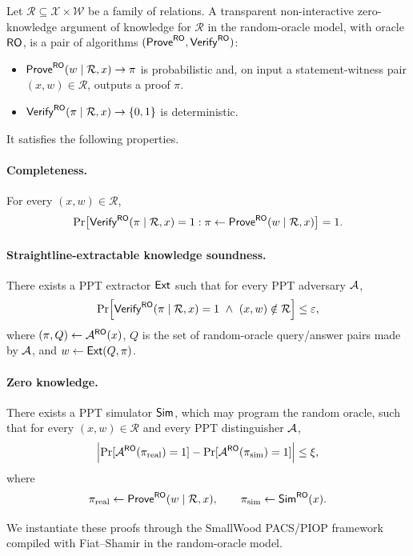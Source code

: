 \begin{definition}\label{def:nizk-ark}
Let $\mathcal R\subseteq \mathcal X\times \mathcal W$ be a family of relations.  A transparent non-interactive
zero-knowledge argument of knowledge for $\mathcal R$ in the random-oracle model, with oracle $\mathsf{RO}$, is a
pair of algorithms $(\mathsf{Prove}^{\mathsf{RO}},\mathsf{Verify}^{\mathsf{RO}})$:
\begin{itemize}[leftmargin=1.25em]
  \item $\mathsf{Prove}^{\mathsf{RO}}(w\mid \mathcal R,x)\to \pi$ is probabilistic and, on input a statement-witness pair
  $(x,w)\in\mathcal R$, outputs a proof $\pi$.
  \item $\mathsf{Verify}^{\mathsf{RO}}(\pi\mid \mathcal R,x)\to\{0,1\}$ is deterministic.
\end{itemize}
It satisfies the following properties.

\paragraph{Completeness.}
For every $(x,w)\in\mathcal R$,
\[
  \Pr\bigl[\mathsf{Verify}^{\mathsf{RO}}(\pi\mid \mathcal R,x)=1 : \pi\gets\mathsf{Prove}^{\mathsf{RO}}(w\mid \mathcal R,x)\bigr]=1.
\]

\paragraph{Straightline-extractable knowledge soundness.}
There exists a PPT extractor $\mathsf{Ext}$ such that for every PPT adversary $\mathcal{A}$,
\[
  \Pr\Bigl[
    \mathsf{Verify}^{\mathsf{RO}}(\pi\mid \mathcal R,x)=1\ \wedge\ (x,w)\notin \mathcal R
  \Bigr]\le \varepsilon,
\]
where $(\pi,Q)\leftarrow \mathcal{A}^{\mathsf{RO}}(x)$, $Q$ is the set of random-oracle query/answer pairs made by $\mathcal{A}$,
and $w\leftarrow \mathsf{Ext}(Q,\pi)$.

\paragraph{Zero knowledge.}
There exists a PPT simulator $\mathsf{Sim}$, which may program the random oracle, such that for every
$(x,w)\in\mathcal R$ and every PPT distinguisher $\mathcal{A}$,
\[
  \Bigl|\Pr[\mathcal{A}^{\mathsf{RO}}(\pi_{\mathrm{real}})=1]-\Pr[\mathcal{A}^{\mathsf{RO}}(\pi_{\mathrm{sim}})=1]\Bigr|\le \xi,
\]
where
\[
  \pi_{\mathrm{real}}\gets \mathsf{Prove}^{\mathsf{RO}}(w\mid \mathcal R,x),
  \qquad
  \pi_{\mathrm{sim}}\gets \mathsf{Sim}^{\mathsf{RO}}(x).
\]
\end{definition}

We instantiate these proofs through the SmallWood PACS/PIOP framework compiled with Fiat--Shamir in the
random-oracle model.

